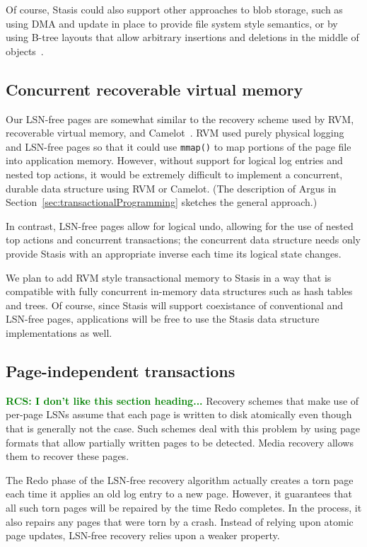 \documentclass[letterpaper,twocolumn,10pt]{article}
\newcommand{\yad}{Stasis\xspace}
\newcommand{\rcs}[1]{\textcolor{green}{\bf RCS: #1}}
\begin{document}
Of course, \yad could also support other approaches to blob storage,
such as using DMA and update in place to provide file system style
semantics, or by using B-tree layouts that allow arbitrary insertions
and deletions in the middle of objects~\cite{esm}.

\subsection{Concurrent recoverable virtual memory}

Our LSN-free pages are somewhat similar to the recovery scheme used by
RVM, recoverable virtual memory, and Camelot~\cite{camelot}. RVM
used purely physical logging and LSN-free pages so that it
could use {\tt mmap()} to map portions of the page file into application
memory\cite{lrvm}.  However, without support for logical log entries
and nested top actions, it would be extremely difficult to implement a
concurrent, durable data structure using RVM or Camelot.  (The description of
Argus in Section~\ref{sec:transactionalProgramming} sketches the
general approach.)  

In contrast, LSN-free pages allow for logical
undo, allowing for the use of nested top actions and concurrent
transactions; the concurrent data structure needs only provide \yad
with an appropriate inverse each time its logical state changes.

We plan to add RVM style transactional memory to \yad in a way that is
compatible with fully concurrent in-memory data structures such as
hash tables and trees.  Of course, since \yad will support coexistance
of conventional and LSN-free pages, applications will be free to use
the \yad data structure implementations as well.


\subsection{Page-independent transactions}
\label{sec:torn-page}
\rcs{I don't like this section heading...}  Recovery schemes that make
use of per-page LSNs assume that each page is written to disk
atomically even though that is generally not the case.  Such schemes
deal with this problem by using page formats that allow partially
written pages to be detected.  Media recovery allows them to recover
these pages.  

The Redo phase of the LSN-free recovery algorithm actually creates a
torn page each time it applies an old log entry to a new page.
However, it guarantees that all such torn pages will be repaired by
the time Redo completes.  In the process, it also repairs any pages
that were torn by a crash.  Instead of relying upon atomic page
updates, LSN-free recovery relies upon a weaker property.
\end{document}
